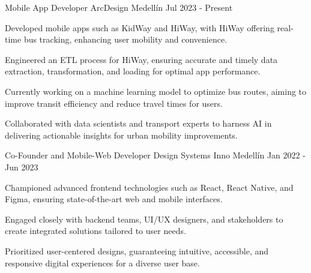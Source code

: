 \newcommand{\quotes}[1]{``#1''}

\begin{cventries}

\cventry
{Mobile App Developer} %
{ArcDesign} %
{Medellín} %
{Jul 2023 - Present} %
{
  \begin{cvitems} %
    \item {Developed mobile apps such as KidWay and HiWay, with HiWay offering real-time bus tracking, enhancing user mobility and convenience.}
    \item {Engineered an ETL process for HiWay, ensuring accurate and timely data extraction, transformation, and loading for optimal app performance.}
    \item {Currently working on a machine learning model to optimize bus routes, aiming to improve transit efficiency and reduce travel times for users.}
    \item {Collaborated with data scientists and transport experts to harness AI in delivering actionable insights for urban mobility improvements.}
  \end{cvitems}
}
\cventry
{Co-Founder and Mobile-Web Developer} %
{Design Systems Inno} %
{Medellín} %
{Jan 2022 - Jun 2023} %
{
  \begin{cvitems} %
    \item {Championed advanced frontend technologies such as React, React Native, and Figma, ensuring state-of-the-art web and mobile interfaces.}
    \item {Engaged closely with backend teams, UI/UX designers, and stakeholders to create integrated solutions tailored to user needs.}
    \item {Prioritized user-centered designs, guaranteeing intuitive, accessible, and responsive digital experiences for a diverse user base.}
  \end{cvitems}
}
\end{cventries}
